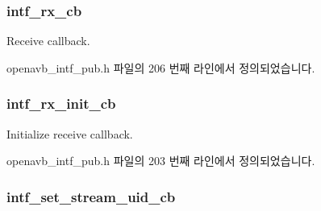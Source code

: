 \subsubsection[{\texorpdfstring{intf\+\_\+rx\+\_\+cb}{intf_rx_cb}}]{ intf\+\_\+rx\+\_\+cb}\hypertarget{structopenavb__intf__cb__t_aa29c6a7d59d3dba57131b157f5634040}{}\label{structopenavb__intf__cb__t_aa29c6a7d59d3dba57131b157f5634040}


Receive callback. 



openavb\+\_\+intf\+\_\+pub.\+h 파일의 206 번째 라인에서 정의되었습니다.

\subsubsection[{\texorpdfstring{intf\+\_\+rx\+\_\+init\+\_\+cb}{intf_rx_init_cb}}]{ intf\+\_\+rx\+\_\+init\+\_\+cb}\hypertarget{structopenavb__intf__cb__t_a9657b542d4ff314437568bd9566d7519}{}\label{structopenavb__intf__cb__t_a9657b542d4ff314437568bd9566d7519}


Initialize receive callback. 



openavb\+\_\+intf\+\_\+pub.\+h 파일의 203 번째 라인에서 정의되었습니다.

\subsubsection[{\texorpdfstring{intf\+\_\+set\+\_\+stream\+\_\+uid\+\_\+cb}{intf_set_stream_uid_cb}}]{ intf\+\_\+set\+\_\+stream\+\_\+uid\+\_\+cb}\hypertarget{structopenavb__intf__cb__t_ab6c8a87db93fc4d75c94e53b3594bee1}{}\label{structopenavb__intf__cb__t_ab6c8a87db93fc4d75c94e53b3594bee1}


